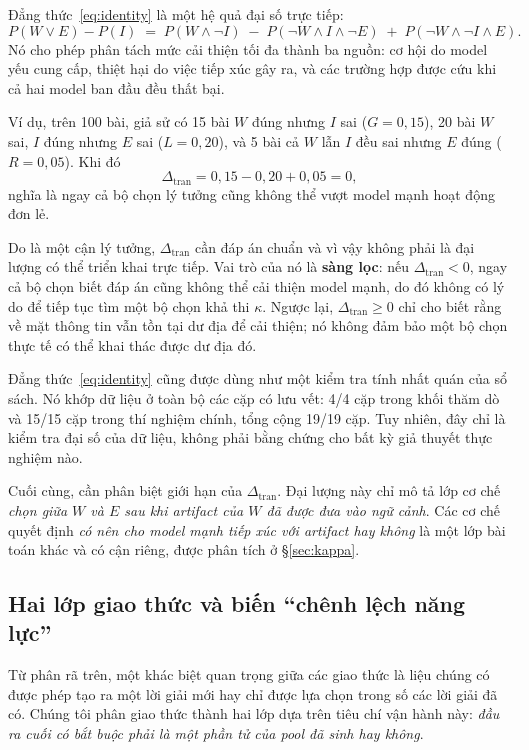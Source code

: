 \documentclass[12pt,a4paper]{article}
\newcommand{\dceil}{\Delta_{\mathrm{tran}}}
\begin{document}
Đẳng thức~\eqref{eq:identity} là một hệ quả đại số trực tiếp:
\[
P(W \vee E) - P(I) \;=\; P(W \wedge \neg I) \;-\; P(\neg W \wedge I \wedge \neg E)
\;+\; P(\neg W \wedge \neg I \wedge E).
\]
Nó cho phép phân tách mức cải thiện tối đa thành ba nguồn: cơ hội do model yếu cung cấp, thiệt
hại do việc tiếp xúc gây ra, và các trường hợp được cứu khi cả hai model ban đầu đều thất bại.

Ví dụ, trên 100 bài, giả sử có 15 bài $W$ đúng nhưng $I$ sai ($G=0{,}15$), 20 bài $W$ sai,
$I$ đúng nhưng $E$ sai ($L=0{,}20$), và 5 bài cả $W$ lẫn $I$ đều sai nhưng $E$ đúng
($R=0{,}05$). Khi đó
\[
\dceil = 0{,}15 - 0{,}20 + 0{,}05 = 0,
\]
nghĩa là ngay cả bộ chọn lý tưởng cũng không thể vượt model mạnh hoạt động đơn lẻ.

Do là một cận lý tưởng, $\dceil$ cần đáp án chuẩn và vì vậy không phải là đại lượng có thể triển
khai trực tiếp. Vai trò của nó là \textbf{sàng lọc}: nếu $\dceil<0$, ngay cả bộ chọn biết đáp án
cũng không thể cải thiện model mạnh, do đó không có lý do để tiếp tục tìm một bộ chọn khả thi
$\kappa$. Ngược lại, $\dceil\geq0$ chỉ cho biết rằng về mặt thông tin vẫn tồn tại dư địa để cải
thiện; nó không đảm bảo một bộ chọn thực tế có thể khai thác được dư địa đó.

Đẳng thức~\eqref{eq:identity} cũng được dùng như một kiểm tra tính nhất quán của sổ sách. Nó
khớp dữ liệu ở toàn bộ các cặp có lưu vết: 4/4 cặp trong khối thăm dò và 15/15 cặp trong thí
nghiệm chính, tổng cộng 19/19 cặp. Tuy nhiên, đây chỉ là kiểm tra đại số của dữ liệu, không phải
bằng chứng cho bất kỳ giả thuyết thực nghiệm nào.

Cuối cùng, cần phân biệt giới hạn của $\dceil$. Đại lượng này chỉ mô tả lớp cơ chế \emph{chọn
giữa $W$ và $E$ sau khi artifact của $W$ đã được đưa vào ngữ cảnh}. Các cơ chế quyết định
\emph{có nên cho model mạnh tiếp xúc với artifact hay không} là một lớp bài toán khác và có cận
riêng, được phân tích ở \S\ref{sec:kappa}.

\subsection{Hai lớp giao thức và biến ``chênh lệch năng lực''}\label{sec:protocols}

Từ phân rã trên, một khác biệt quan trọng giữa các giao thức là liệu chúng có được phép tạo ra
một lời giải mới hay chỉ được lựa chọn trong số các lời giải đã có. Chúng tôi phân giao thức
thành hai lớp dựa trên tiêu chí vận hành này: \emph{đầu ra cuối có bắt buộc phải là một phần tử
của pool đã sinh hay không}.
\end{document}

